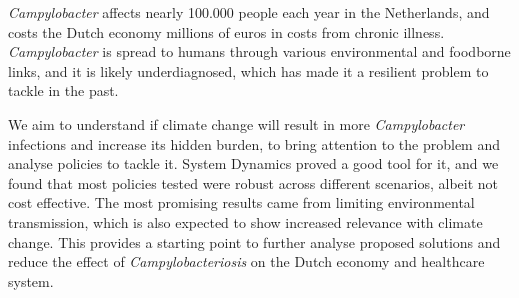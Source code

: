

\textit{Campylobacter} affects nearly 100.000 people each year in the Netherlands, and costs the Dutch economy millions of euros in costs from chronic illness. \textit{Campylobacter} is spread to humans through various environmental and foodborne links, and it is likely underdiagnosed, which has made it a resilient problem to tackle in the past. 

We aim to understand if climate change will result in more \textit{Campylobacter} infections and increase its hidden burden, to bring attention to the problem and analyse policies to tackle it. System Dynamics proved a good tool for it, and we found that most policies tested were robust across different scenarios, albeit not cost effective. The most promising results came from limiting environmental transmission, which is also expected to show increased relevance with climate change. This provides a starting point to further analyse proposed solutions and reduce the effect of \textit{Campylobacteriosis} on the Dutch economy and healthcare system.






